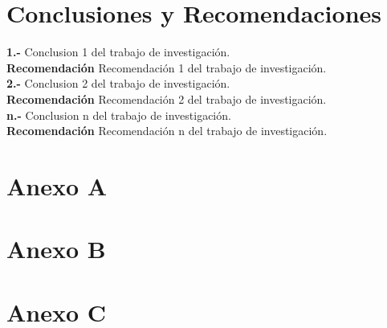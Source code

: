 \documentclass[oneside,11pt]{Latex/Classes/PhDthesisPSnPDF}
\begin{document}
\chapter{Conclusiones y Recomendaciones}

\textbf{1.-} Conclusion 1 del trabajo de investigación.\\

\textbf{Recomendación} Recomendación 1 del trabajo de investigación.\\

\textbf{2.-} Conclusion 2 del trabajo de investigación.\\

\textbf{Recomendación} Recomendación 2 del trabajo de investigación.\\

\textbf{n.-} Conclusion n del trabajo de investigación.\\

\textbf{Recomendación} Recomendación n del trabajo de investigación.\\

\appendix
\renewcommand{\thechapter}{\Alph{chapter}}

\chapter{Anexo A}

\chapter{Anexo B}

\chapter{Anexo C}

\renewcommand{\bibname}{Lista de Referencias}
 
 

\end{document}
